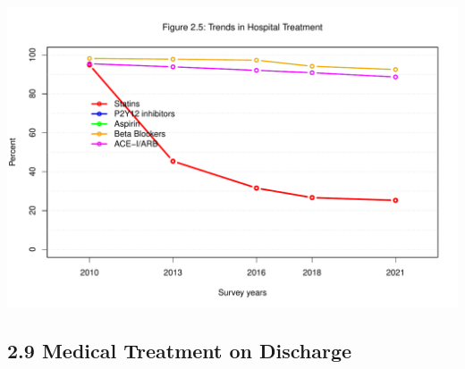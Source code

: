 \documentclass[
]{article}
\begin{document}
\includegraphics{‏‏ACSIS_2024_v1_with_trend_pdf_files/figure-latex/unnamed-chunk-138-1.pdf}

\pagebreak

\subsection{2.9 Medical Treatment on
Discharge}\label{medical-treatment-on-discharge-1}

\hfill\break
\end{document}
